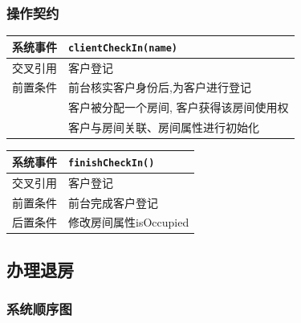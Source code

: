 \documentclass[black,normal,cn]{elegantnote}
\newcommand{\code}[1]{\colorbox{light-gray}{\texttt{#1}}}
\begin{document}
\subsubsection{操作契约}

\begin{center}
    \begin{tabular}{|>{\centering}m{}|m{}|}
        \hline
        系统事件 & \multicolumn{1}{l|}{\code{clientCheckIn(name)}} \\
        \hline
        交叉引用 & 客户登记                                        \\
        \hline
        前置条件 & 前台核实客户身份后,为客户进行登记               \\
        \hline
        \multirow{2}{*}{后置条件}
                 & 客户被分配一个房间, 客户获得该房间使用权        \\
        \cline{2-2}
                 & 客户与房间关联、房间属性进行初始化              \\
        \hline
    \end{tabular}
\end{center}

\begin{center}
    \begin{tabular}{|>{\centering}m{}|m{}|}
        \hline
        系统事件   & \multicolumn{1}{l|}{\code{finishCheckIn()}} \\
        \hline
        交叉引用   & 客户登记                                    \\
        \hline
        前置条件   & 前台完成客户登记                            \\
        \hline
        {后置条件} & 修改房间属性isOccupied                      \\
        \hline
    \end{tabular}
\end{center}

\subsection{办理退房}

\subsubsection{系统顺序图}
\end{document}

